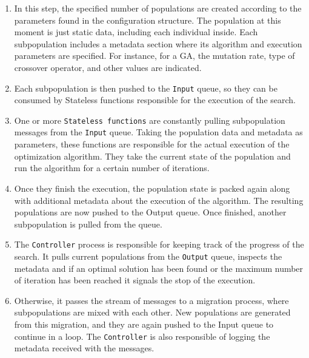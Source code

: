 \documentclass[review]{elsarticle}
\begin{document}
\begin{enumerate}
\item In this step, the specified number of populations are created according to the 
parameters found in the configuration structure. The population at this moment is just
static data, including each individual inside. Each subpopulation includes a metadata
section where its algorithm and execution parameters are specified. For instance, 
for a GA, the mutation rate, type of crossover operator, and other values are indicated.

\item Each subpopulation is then pushed to the \texttt{Input} queue, so they can be consumed 
by Stateless functions responsible for the execution of the search.  %

\item One or more \texttt{Stateless functions} are constantly pulling subpopulation messages
from the \texttt{Input} queue. Taking the population data and metadata as parameters, these 
functions are responsible for the actual execution of the optimization algorithm. 
They take the current state of the population and run the algorithm for a certain 
number of iterations. 

\item Once they finish the execution, the population state
is packed again along with additional metadata about the execution of the algorithm.
The resulting populations are now pushed to the Output queue. Once finished, another 
subpopulation is pulled from the queue.

\item The \texttt{Controller} process is responsible for keeping track of the progress of 
the search. It pulls current populations from the \texttt{Output} queue, inspects the metadata 
and if an optimal solution has been found or the maximum number of iteration has been
reached it signals the stop of the execution. 

\item Otherwise, it passes the stream of messages 
to a migration process, where subpopulations are mixed with each other. New populations 
are generated from this migration, and they are again pushed to the Input queue to continue 
in a loop. The \texttt{Controller} is also responsible of logging the metadata received with the
messages.  
\end{enumerate}
\end{document}
